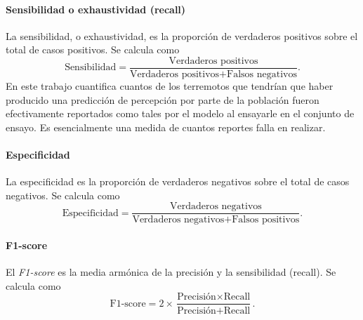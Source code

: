 \documentclass[a4paper]{report}
\begin{document}
\paragraph{Sensibilidad o exhaustividad (recall)}
La sensibilidad, o exhaustividad, es la proporción de verdaderos positivos sobre el total de casos positivos.
Se calcula como
\begin{equation}
	\text{Sensibilidad} = \frac{\text{Verdaderos positivos}}{\text{Verdaderos positivos} + \text{Falsos negativos}}.
\end{equation}
En este trabajo cuantifica cuantos de los terremotos que tendrían que haber producido una predicción de percepción por parte de la población fueron efectivamente reportados como tales por el modelo al ensayarle en el conjunto de ensayo.
Es esencialmente una medida de cuantos reportes falla en realizar.


\paragraph{Especificidad}
La especificidad es la proporción de verdaderos negativos sobre el total de casos negativos.
Se calcula como
\begin{equation}
	\text{Especificidad} = \frac{\text{Verdaderos negativos}}{\text{Verdaderos negativos} + \text{Falsos positivos}}.
\end{equation}


\paragraph{F1-score}
El \emph{F1-score} es la media armónica de la precisión y la sensibilidad (recall).
Se calcula como
\begin{equation}
	\text{F1-score} = 2 \times \frac{\text{Precisión} \times \text{Recall}}{\text{Precisión} + \text{Recall}}.
\end{equation}
\end{document}

